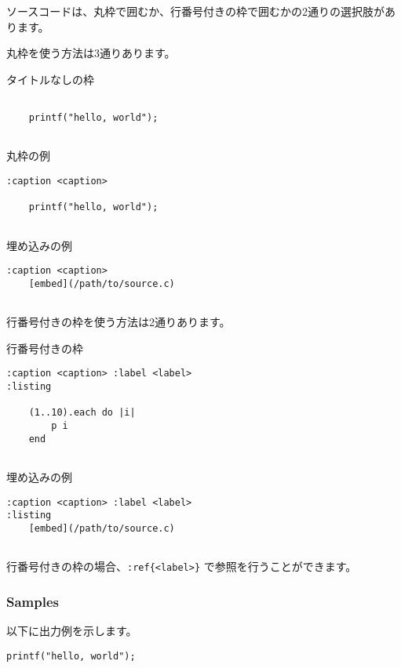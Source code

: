 \documentclass[a4j]{jarticle}
\begin{document}
ソースコードは、丸枠で囲むか、行番号付きの枠で囲むかの2通りの選択肢があります。

丸枠を使う方法は3通りあります。

\begin{itembox}[c]{タイトルなしの枠}
\begin{verbatim}
　
    printf("hello, world");
　
\end{verbatim}
\end{itembox}

\begin{itembox}[c]{丸枠の例}
\begin{verbatim}
:caption <caption>

    printf("hello, world");
　
\end{verbatim}
\end{itembox}

\begin{itembox}[c]{埋め込みの例}
\begin{verbatim}
:caption <caption>
    [embed](/path/to/source.c)
　
\end{verbatim}
\end{itembox}

行番号付きの枠を使う方法は2通りあります。

\begin{itembox}[c]{行番号付きの枠}
\begin{verbatim}
:caption <caption> :label <label>
:listing

    (1..10).each do |i|
        p i
    end
　
\end{verbatim}
\end{itembox}

\begin{itembox}[c]{埋め込みの例}
\begin{verbatim}
:caption <caption> :label <label>
:listing
    [embed](/path/to/source.c)
　
\end{verbatim}
\end{itembox}

行番号付きの枠の場合、{\tt :}{\tt ref\{\textless{}label\textgreater{}\}} で参照を行うことができます。

\subsubsection{Samples}

以下に出力例を示します。

\begin{screen}
\begin{verbatim}
printf("hello, world");
\end{verbatim}
\end{screen}
\end{document}
